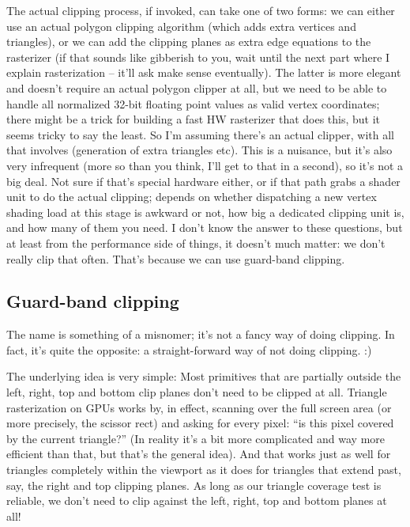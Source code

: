 \documentclass[12pt]{article}
\begin{document}
The actual clipping process, if invoked, can take one of two forms: we can either use an actual polygon clipping algorithm (which adds extra vertices and triangles), or we can add the clipping planes as extra edge equations to the rasterizer (if that sounds like gibberish to you, wait until the next part where I explain rasterization – it’ll ask make sense eventually). The latter is more elegant and doesn’t require an actual polygon clipper at all, but we need to be able to handle all normalized 32-bit floating point values as valid vertex coordinates; there might be a trick for building a fast HW rasterizer that does this, but it seems tricky to say the least. So I’m assuming there’s an actual clipper, with all that involves (generation of extra triangles etc). This is a nuisance, but it’s also very infrequent (more so than you think, I’ll get to that in a second), so it’s not a big deal. Not sure if that’s special hardware either, or if that path grabs a shader unit to do the actual clipping; depends on whether dispatching a new vertex shading load at this stage is awkward or not, how big a dedicated clipping unit is, and how many of them you need. I don’t know the answer to these questions, but at least from the performance side of things, it doesn’t much matter: we don’t really clip that often. That’s because we can use guard-band clipping.

\subsection{Guard-band clipping}
\label{sec:org1f5e111}

The name is something of a misnomer; it’s not a fancy way of doing clipping. In fact, it’s quite the opposite: a straight-forward way of not doing clipping. :)

The underlying idea is very simple: Most primitives that are partially outside the left, right, top and bottom clip planes don’t need to be clipped at all. Triangle rasterization on GPUs works by, in effect, scanning over the full screen area (or more precisely, the scissor rect) and asking for every pixel: “is this pixel covered by the current triangle?” (In reality it’s a bit more complicated and way more efficient than that, but that’s the general idea). And that works just as well for triangles completely within the viewport as it does for triangles that extend past, say, the right and top clipping planes. As long as our triangle coverage test is reliable, we don’t need to clip against the left, right, top and bottom planes at all!
\end{document}
